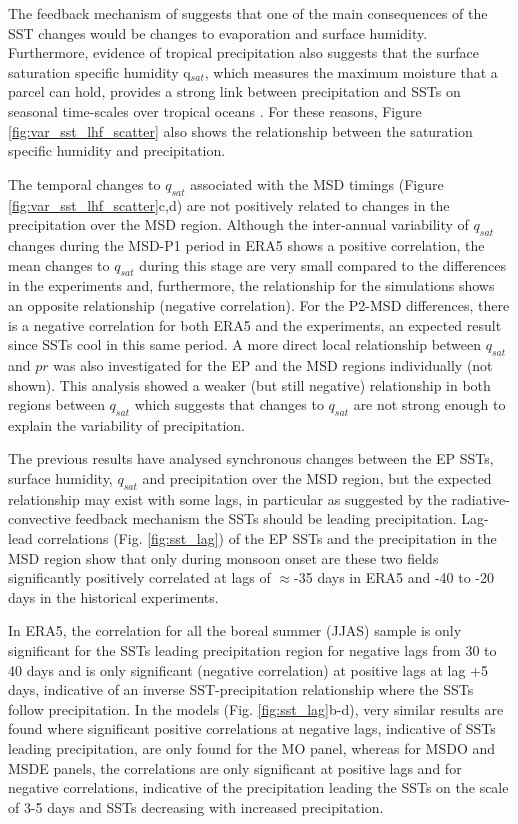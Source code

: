 The feedback mechanism of \cite{magana1999} suggests that one of the main consequences of the SST changes would be changes to evaporation and surface humidity. Furthermore, evidence of tropical precipitation also suggests that the surface saturation specific humidity q$_{sat}$, which measures the maximum moisture that a parcel can hold, provides a strong link between precipitation and SSTs on seasonal time-scales over tropical oceans \citep{yang2019,good2021}. For these reasons, Figure \ref{fig:var_sst_lhf_scatter} also shows the relationship between the saturation specific humidity and precipitation. 

The temporal changes to $q_{sat}$ associated with the MSD timings (Figure \ref{fig:var_sst_lhf_scatter}c,d) are not positively related to changes in the precipitation over the MSD region. Although the inter-annual variability of $q_{sat}$ changes during the MSD-P1  period in ERA5 shows a positive correlation, the mean changes to $q_{sat}$ during this stage are very small compared to the differences in the experiments and, furthermore, the relationship for the simulations shows an opposite relationship (negative correlation). For the P2-MSD differences, there is a negative correlation for both ERA5 and the experiments, an expected result since SSTs cool in this same period.  
A more direct local relationship between $q_{sat}$ and $pr$ was also investigated for the EP and the MSD regions individually (not shown). This analysis showed a weaker (but still negative) relationship in both regions between $q_{sat}$ which suggests that changes to $q_{sat}$ are not strong enough to explain the variability of precipitation. 

The previous results have analysed synchronous changes between the EP SSTs, surface humidity, $q_{sat}$ and precipitation over the MSD region, but the expected relationship may exist with some lags, in particular as suggested by the radiative-convective feedback mechanism the SSTs should be leading precipitation. 
Lag-lead correlations (Fig. \ref{fig:sst_lag}) of the EP SSTs and the precipitation in the MSD region show that only during monsoon onset are these two fields significantly positively correlated at lags of $\approx$-35 days in ERA5 and -40 to -20 days in the historical experiments. 

In ERA5, the correlation for all the boreal summer (JJAS) sample is only significant for the SSTs leading  precipitation region for negative lags from 30 to 40 days and is only significant (negative correlation) at positive lags at lag +5 days, indicative of an inverse SST-precipitation relationship where the SSTs follow precipitation. 
In the models (Fig. \ref{fig:sst_lag}b-d), very similar results are found where significant positive correlations at negative lags, indicative of SSTs leading precipitation, are only found for the MO panel, whereas for MSDO and MSDE panels, the correlations are only significant at positive lags and for negative correlations, indicative of the precipitation leading the SSTs on the scale of 3-5 days and SSTs decreasing with increased precipitation.

